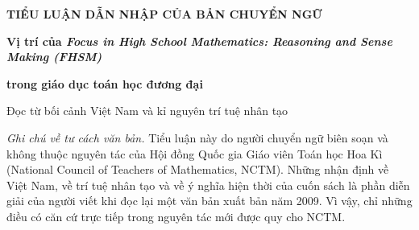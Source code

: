 
\cleardoublepage
\gdef\CurrentRunningHead{Tiểu luận dẫn nhập}

{}

\begingroup
{}

\thispagestyle{plain}

\begin{center}
{\small\bfseries TIỂU LUẬN DẪN NHẬP CỦA BẢN CHUYỂN NGỮ\par}

\vspace{0.9\baselineskip}

{\Large\bfseries Vị trí của \emph{Focus in High School Mathematics: Reasoning and Sense Making (FHSM)}\par}

\vspace{0.15\baselineskip}

{\Large\bfseries trong giáo dục toán học đương đại\par}

\vspace{0.65\baselineskip}

{\large
Đọc từ bối cảnh Việt Nam và kỉ nguyên trí tuệ nhân tạo}
\end{center}

\vspace{1.15\baselineskip}

\begingroup
\small

\noindent
\textit{Ghi chú về tư cách văn bản.}
Tiểu luận này do người chuyển ngữ biên soạn và không thuộc nguyên tác của Hội đồng Quốc gia Giáo viên Toán học Hoa Kì (National Council of Teachers of Mathematics, NCTM). Những nhận định về Việt Nam, về trí tuệ nhân tạo và về ý nghĩa hiện thời của cuốn sách là phần diễn giải của người viết khi đọc lại một văn bản xuất bản năm 2009. Vì vậy, chỉ những điều có căn cứ trực tiếp trong nguyên tác mới được quy cho NCTM.

